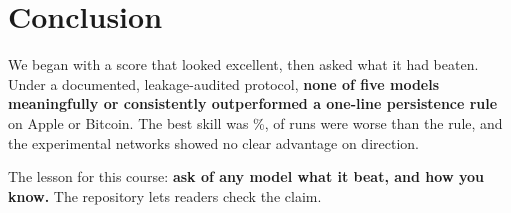 \section{Conclusion}
\label{sec:conclusion}

We began with a score that looked excellent, then asked what it had beaten. Under
a documented, leakage-audited protocol, \textbf{none of five models meaningfully or
consistently outperformed a one-line persistence rule} on Apple or Bitcoin. The
best skill was \BestAAPLSkill\%, \NBelowAll{} of \NRunTotal{} runs were worse than
the rule, and the experimental networks showed no clear advantage on direction.

The lesson for this course: \textbf{ask of any model what it beat, and how you
know.} The repository lets readers check the claim.
